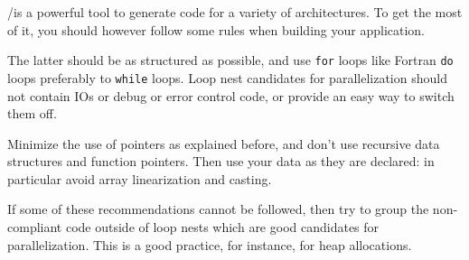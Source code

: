 \documentclass[a4paper]{article}
\begin{document}
\Apips/\Apfa is a powerful tool to generate code for a variety
of architectures. To get the most of it, you should however follow
some rules when building your application.

The latter should be as structured as possible, and use
\lstinline{for} loops like Fortran \lstinline|do| loops preferably to
\lstinline{while} loops. Loop nest candidates for parallelization should
not contain IOs or debug or error control code, or provide an easy way
to switch them off.

Minimize the use of pointers as explained before, and don't use
recursive data structures and function pointers. Then use your data as they are
declared: in particular avoid array linearization and casting.


If some of these recommendations cannot be followed, then try to group
the non-compliant code outside of loop nests which are good
candidates for parallelization.  This is a good practice, for instance,
for heap allocations.



\end{document}
